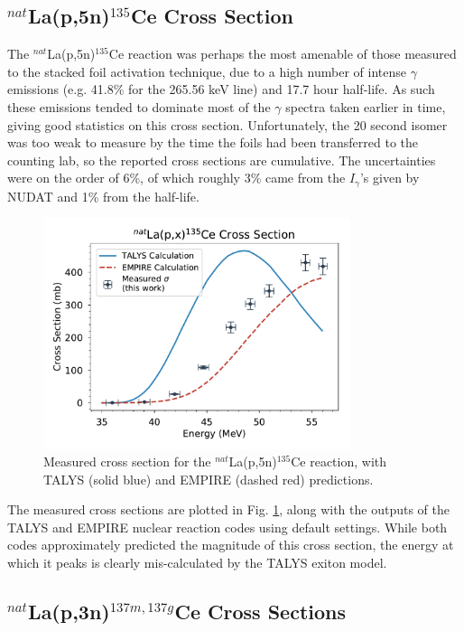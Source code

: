 \documentclass[aps,twocolumn,secnumarabic,balancelastpage,amsmath,amssymb,nofootinbib,floatfix]{revtex4-1}
\begin{document}
\subsection{$^{nat}$La(p,5n)$^{135}$Ce Cross Section}

The $^{nat}$La(p,5n)$^{135}$Ce reaction was perhaps the most amenable of those measured to the stacked foil activation technique, due to a high number of intense $\gamma$ emissions (e.g. 41.8\% for the 265.56 keV line) and 17.7 hour half-life.  As such these emissions tended to dominate most of the $\gamma$ spectra taken earlier in time, giving good statistics on this cross section.  Unfortunately, the 20 second isomer was too weak to measure by the time the foils had been transferred to the counting lab, so the reported cross sections are cumulative.  The uncertainties were on the order of 6\%, of which roughly 3\% came from the $I_{\gamma}$'s given by NUDAT and 1\% from the half-life.  

\begin{figure}[htb]
\includegraphics[width=9cm]{cross_sections/135CE}
\caption{Measured cross section for the $^{nat}$La(p,5n)$^{135}$Ce reaction, with TALYS (solid blue) and EMPIRE (dashed red) predictions.
}
\label{fig:135CE}
\end{figure}

The measured cross sections are plotted in Fig. \ref{fig:135CE}, along with the outputs of the TALYS and EMPIRE nuclear reaction codes using default settings.  While both codes approximately predicted the magnitude of this cross section, the energy at which it peaks is clearly mis-calculated by the TALYS exiton model.

\subsection{$^{nat}$La(p,3n)$^{137m,137g}$Ce Cross Sections}
\end{document}
